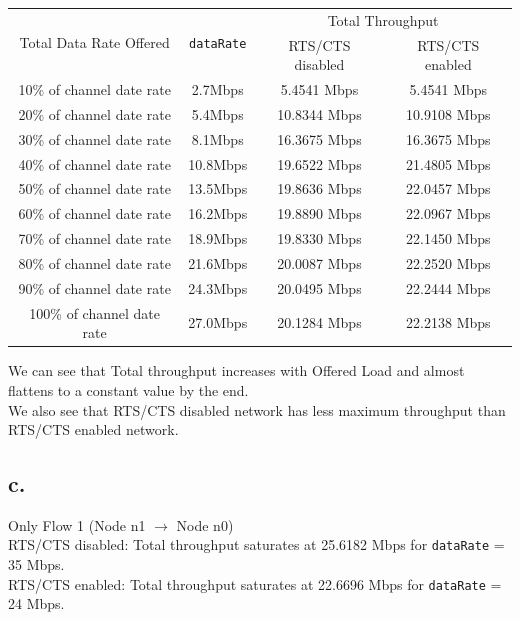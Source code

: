 \documentclass[11pt, fleqn]{article}
\begin{document}
\begin{table}[H]
    \centering
    \begin{tabular}{||c|c||c|c||}
         \hline
         \multirow{2}{*}{Total Data Rate Offered} & \multirow{2}{*}{\texttt{dataRate}} & \multicolumn{2}{c||}{Total Throughput} \\
         & & RTS/CTS disabled & RTS/CTS enabled \\
         \hline %
         10\% of channel date rate & 2.7Mbps & 5.4541 Mbps & 5.4541 Mbps \\
         \hline %
         20\% of channel date rate & 5.4Mbps & 10.8344 Mbps & 10.9108 Mbps \\
         \hline %
         30\% of channel date rate & 8.1Mbps & 16.3675 Mbps & 16.3675 Mbps \\
         \hline %
         40\% of channel date rate & 10.8Mbps & 19.6522 Mbps & 21.4805 Mbps \\
         \hline %
         50\% of channel date rate & 13.5Mbps & 19.8636 Mbps & 22.0457 Mbps \\
         \hline %
         60\% of channel date rate & 16.2Mbps & 19.8890 Mbps & 22.0967 Mbps \\
         \hline %
         70\% of channel date rate & 18.9Mbps & 19.8330 Mbps & 22.1450 Mbps \\
         \hline %
         80\% of channel date rate & 21.6Mbps & 20.0087 Mbps & 22.2520 Mbps \\
         \hline %
         90\% of channel date rate & 24.3Mbps & 20.0495 Mbps & 22.2444 Mbps \\
         \hline %
         100\% of channel date rate & 27.0Mbps & 20.1284 Mbps & 22.2138 Mbps \\
         \hline         
    \end{tabular}
\end{table}

We can see that Total throughput increases with Offered Load and almost flattens to a constant value by the end. \\
We also see that RTS/CTS disabled network has less maximum throughput than RTS/CTS enabled network. \\

\subsection*{c.}
Only Flow 1 (Node n1 $\rightarrow$ Node n0) \\
RTS/CTS disabled: Total throughput saturates at 25.6182 Mbps for \texttt{dataRate} = 35 Mbps. \\
RTS/CTS enabled: Total throughput saturates at 22.6696 Mbps for \texttt{dataRate} = 24 Mbps. \\
\end{document}
